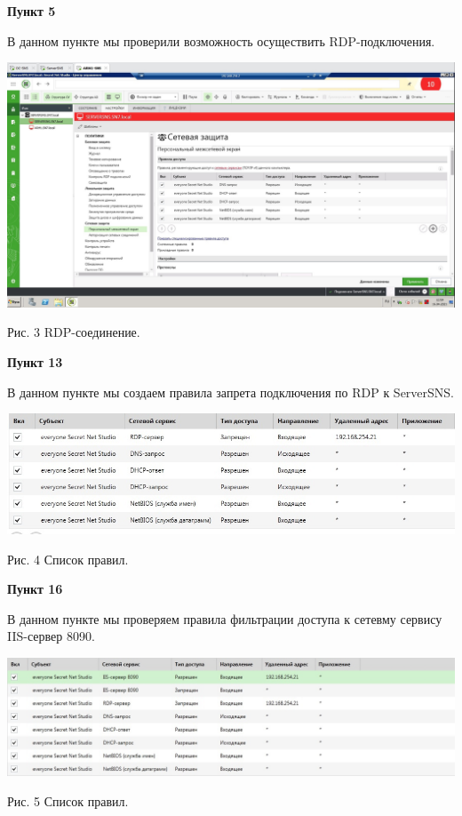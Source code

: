 \documentclass[a4paper,14pt]{extarticle}
\begin{document}
    \newpage
    \textbf{Пункт 5}
    \vspace{-3ex}
    \begin{center}
        \singlespacing
        В данном пункте мы проверили возможность осуществить RDP-подключения.

        \includegraphics[scale=0.3]{pics/5.jpg}

        Рис. 3 RDP-соединение.
    \end{center}

    \textbf{Пункт 13}
    \vspace{-3ex}
    \begin{center}
        \singlespacing
        В данном пункте мы создаем правила запрета подключения по RDP к ServerSNS.

        \includegraphics[scale=0.55]{pics/13.jpg}

        Рис. 4 Список правил.
    \end{center}

    \newpage
    \textbf{Пункт 16}
    \vspace{-3ex}
    \begin{center}
        \singlespacing
        В данном пункте мы проверяем правила фильтрации доступа к сетевму сервису IIS-сервер 8090.

        \includegraphics[scale=0.45]{pics/16.jpg}

       Рис. 5 Список правил.
    \end{center}
    
\end{document}
